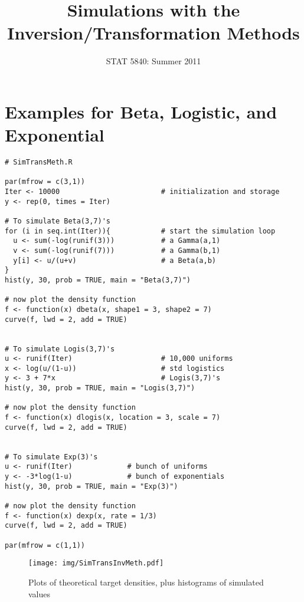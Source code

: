 \documentclass[11pt,english]{article}
\title{Simulations with the Inversion/Transformation Methods}
\date{STAT 5840: Summer 2011}
\begin{document}
\maketitle

\thispagestyle{empty}

\section*{Examples for Beta, Logistic, and Exponential}
\label{sec-1}


\begin{verbatim}
# SimTransMeth.R

par(mfrow = c(3,1))
Iter <- 10000                        # initialization and storage    
y <- rep(0, times = Iter)

# To simulate Beta(3,7)'s 
for (i in seq.int(Iter)){            # start the simulation loop        
  u <- sum(-log(runif(3)))           # a Gamma(a,1)
  v <- sum(-log(runif(7)))           # a Gamma(b,1)
  y[i] <- u/(u+v)                    # a Beta(a,b)
}
hist(y, 30, prob = TRUE, main = "Beta(3,7)")

# now plot the density function
f <- function(x) dbeta(x, shape1 = 3, shape2 = 7)
curve(f, lwd = 2, add = TRUE)


# To simulate Logis(3,7)'s
u <- runif(Iter)                     # 10,000 uniforms
x <- log(u/(1-u))                    # std logistics
y <- 3 + 7*x                         # Logis(3,7)'s
hist(y, 30, prob = TRUE, main = "Logis(3,7)")

# now plot the density function
f <- function(x) dlogis(x, location = 3, scale = 7)
curve(f, lwd = 2, add = TRUE)


# To simulate Exp(3)'s
u <- runif(Iter)             # bunch of uniforms
y <- -3*log(1-u)             # bunch of exponentials
hist(y, 30, prob = TRUE, main = "Exp(3)")

# now plot the density function
f <- function(x) dexp(x, rate = 1/3)
curve(f, lwd = 2, add = TRUE)

par(mfrow = c(1,1))
\end{verbatim}

\begin{figure}[h!]
\centering
\texttt{[image: img/SimTransInvMeth.pdf]}
\caption{\label{fig:yplot}Plots of theoretical target densities, plus histograms of simulated values}
\end{figure}
\end{document}

